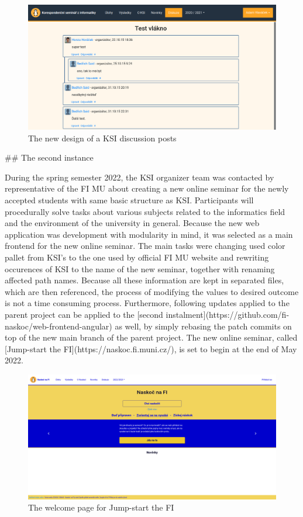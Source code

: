 \documentclass[
  digital, %
  oneside, %
  lof,     %
  lot,     %
]{fithesis4}
\begin{document}
{\begin{figure}
\includegraphics[width=\textwidth]{assets/img/discussion-new}
\caption{The new design of a KSI discussion posts}
\label{fig:discuss-new}
\end{figure}

## The second instance

During the spring semester 2022, the KSI organizer team was contacted by representative of the FI MU about creating a new online seminar for the newly accepted students with same basic structure as KSI. Participants will procedurally solve tasks about various subjects related to the informatics field and the environment of the university in general. Because the new web application was development with modularity in mind, it was selected as a main frontend for the new online seminar. The main tasks were changing used color pallet from KSI's to the one used by official FI MU website and rewriting occurences of KSI to the name of the new seminar, together with renaming affected path names. Because all these information are kept in separated files, which are then referenced, the process of modifying the values to desired outcome is not a time consuming process. Furthermore, following updates applied to the parent project can be applied to the [second instalment](https://github.com/fi-naskoc/web-frontend-angular) as well, by simply rebasing the patch commits on top of the new main branch of the parent project. The new online seminar, called [Jump-start the FI](https://naskoc.fi.muni.cz/), is set to begin at the end of May 2022.

\begin{figure}
\includegraphics[width=\textwidth]{assets/img/naskoc-na-fi}
\caption{The welcome page for Jump-start the FI}
\label{fig:naskoc-na-fi}
\end{figure}

}
\end{document}
